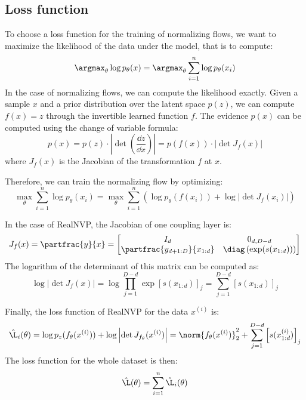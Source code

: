 \subsection{Loss function}
To choose a loss function for the training of normalizing flows, we want to maximize the likelihood of the data under the model, that is to compute:
\begin{equation*}
    \argmax_{\theta} \log p_\theta(x) = \argmax_{\theta} \sum_{i=1}^n \log p_\theta(x_i)
\end{equation*}
In the case of normalizing flows, we can compute the likelihood exactly. Given a sample $x$ and a prior distribution over the latent space $p(z)$, we can compute $f(x)=z$ through the invertible learned function $f$. The evidence $p(x)$ can be computed using the change of variable formula:
\begin{equation*}
    p(x) = p(z)\cdot\left|\det\left(\frac{\dd z}{\dd x}\right)\right| = p(f(x))\cdot\left|\det J_f(x)\right|
\end{equation*}
where $J_f(x)$ is the Jacobian of the transformation $f$ at $x$. 

Therefore, we can train the normalizing flow by optimizing:
\begin{equation*}
    \max_\theta\sum_{i=1}^n \log p_\theta(x_i) = \max_\theta\sum_{i=1}^n \left(\log p_\theta(f(x_i)) + \log\left|\det J_f(x_i)\right|\right)
\end{equation*}

In the case of RealNVP, the Jacobian of one coupling layer is:
\begin{equation*}
    J_f(x) = \partfrac{y}{x} = \begin{bmatrix}
        I_d & 0_{d, D-d}\\
        \partfrac{y_{d+1:D}}{x_{1:d}} & \diag\left(\exp(s(x_{1:d}))\right)
    \end{bmatrix}
\end{equation*}
The logarithm of the determinant of this matrix can be computed as:
\begin{equation*}
    \log\left|\det J_f(x)\right| = \log\prod_{j=1}^{D-d}\exp\left[s(x_{1:d})\right]_j = \sum_{j=1}^{D-d} \left[s(x_{1:d})\right]_j
\end{equation*}

Finally, the loss function of RealNVP for the data $x^{(i)}$ is:
\begin{equation*}
    \hat{\L}_i(\theta) = \log p_z(f_\theta(x^{(i)})) + \log\left|\det J_{f_\theta}(x^{(i)})\right| = \norm{f_\theta(x^{(i)})}_2^2 + \sum_{j=1}^{D-d} \left[s(x_{1:d}^{(i)})\right]_j
\end{equation*}
The loss function for the whole dataset is then:
\begin{equation*}
    \hat{\L}(\theta) = \sum_{i=1}^n \hat{\L}_i(\theta)
\end{equation*}

